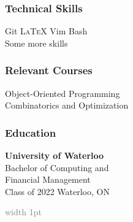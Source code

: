 \documentclass{mxresume}
\newcommand{\Bullet}{\tiny\textbf{ }\raisebox{0.5mm}\textbullet\tiny\textbf{ }\textbf{ }\normalsize}
\newcommand{\Bar}{\textbf{ }\textbar\textbf{ }}
\begin{document}
\begin{minipage}[t]{0.25\textwidth}
\begin{sidebar}
\subsubsection*{Technical Skills}
Git \Bullet \textsc{\LaTeX} \Bullet Vim \Bullet Bash \\
Some more skills
\subsubsection{Relevant Courses}
Object-Oriented Programming \\
Combinatorics and Optimization
\subsubsection*{Education}
\textbf{University of Waterloo} \\
Bachelor of Computing and \\
Financial Management \\
Class of 2022 \textcolor{gray}{\Bar} Waterloo, ON
\end{sidebar}
\end{minipage}
\hfill\textcolor{gray}{\vline width 1pt}\hfill
\end{document}
